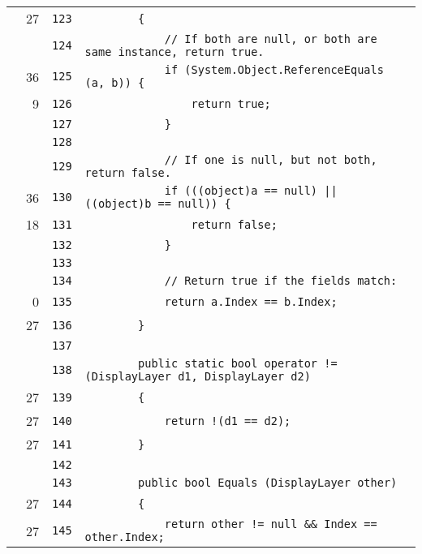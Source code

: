 \documentclass[a4paper,10pt]{article}
\begin{document}
\begin{longtable}[l]{lrrl}
\cellcolor{green} & 27 & \verb~123~ & \verb~        {~\\
\cellcolor{gray} &  & \verb~124~ & \verb~            // If both are null, or both are same instance, return true.~\\
\cellcolor{green} & 36 & \verb~125~ & \verb~            if (System.Object.ReferenceEquals (a, b)) {~\\
\cellcolor{green} & 9 & \verb~126~ & \verb~                return true;~\\
\cellcolor{gray} &  & \verb~127~ & \verb~            }~\\
\cellcolor{gray} &  & \verb~128~ & \verb~~\\
\cellcolor{gray} &  & \verb~129~ & \verb~            // If one is null, but not both, return false.~\\
\cellcolor{green} & 36 & \verb~130~ & \verb~            if (((object)a == null) || ((object)b == null)) {~\\
\cellcolor{green} & 18 & \verb~131~ & \verb~                return false;~\\
\cellcolor{gray} &  & \verb~132~ & \verb~            }~\\
\cellcolor{gray} &  & \verb~133~ & \verb~~\\
\cellcolor{gray} &  & \verb~134~ & \verb~            // Return true if the fields match:~\\
\cellcolor{red} & 0 & \verb~135~ & \verb~            return a.Index == b.Index;~\\
\cellcolor{green} & 27 & \verb~136~ & \verb~        }~\\
\cellcolor{gray} &  & \verb~137~ & \verb~~\\
\cellcolor{gray} &  & \verb~138~ & \verb~        public static bool operator != (DisplayLayer d1, DisplayLayer d2)~\\
\cellcolor{green} & 27 & \verb~139~ & \verb~        {~\\
\cellcolor{green} & 27 & \verb~140~ & \verb~            return !(d1 == d2);~\\
\cellcolor{green} & 27 & \verb~141~ & \verb~        }~\\
\cellcolor{gray} &  & \verb~142~ & \verb~~\\
\cellcolor{gray} &  & \verb~143~ & \verb~        public bool Equals (DisplayLayer other)~\\
\cellcolor{green} & 27 & \verb~144~ & \verb~        {~\\
\cellcolor{green} & 27 & \verb~145~ & \verb~            return other != null && Index == other.Index;~\\

\end{longtable}
\end{document}
